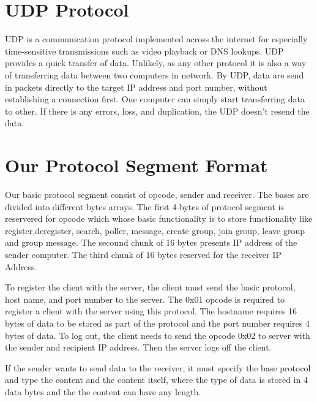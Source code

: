     \noindent

    \section{UDP Protocol}\label{sec:udp protocol}
    UDP is a communication protocol implemented across the internet for especially time-sensitive
    transmissions such as video playback or DNS lookups.
    UDP provides a quick transfer of data.
    Unlikely, as any other protocol it is also a way of transferring data between two computers in
    network.
    By UDP, data are send in packets directly to the target IP address and port number,
    without establishing a connection first.
    One computer can simply start transferring data to other.
    If there is any errors, loss, and duplication, the UDP doesn't resend the data.

    \medskip

    \noindent

    \section{Our Protocol Segment Format}\label{sec:our protocol}
    Our  basic protocol segment  consist of opcode, sender and receiver. 
    The bases are divided into different bytes arrays.
    The first 4-bytes of protocol segment is reservered for opcode which whose
     basic functionality is to store  functionality like register,deregister, search, 
     poller, message, create group, join group, leave group and group message.
    The secound chunk of 16 bytes presents IP address of the sender computer. 
    The third chunk of 16 bytes reserved for the receiver IP Address.
    \medskip
    
    \noindent
    To register the client with the server, the client must send the basic protocol, host
     name, and port number to the server. 
    The 0x01 opcode is required to register a client with the server using this protocol.
    The hostname requires 16 bytes of data to be stored as part of the protocol and 
    the port number requires 4 bytes of data.
    To log out, the client  needs to send the opcode 0x02 to server  with the sender and
    recipient IP address.
    Then the server logs off the client.
     \medskip
    
    \noindent
    If the sender wants to send data to the receiver, it must specify the base protocol and type
    the content and the content itself, where the type of data is stored in 4 data bytes and the
    the content can have any length. 
 
